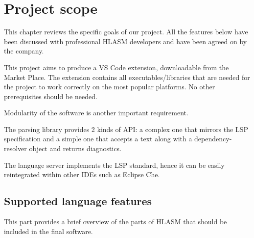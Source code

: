 \chapter{Project scope}

This chapter reviews the specific goals of our project.
All the features below have been discussed with professional HLASM developers and have been agreed on by the company.

This project aims to produce a VS Code extension, downloadable from the Market Place. The extension contains all executables/libraries that are needed for the project to work correctly on the most popular platforms. No other prerequisites should be needed.

Modularity of the software is another important requirement. 

The parsing library provides 2 kinds of API: a complex one that mirrors the LSP specification and a simple one that accepts a text along with a dependency-resolver object and returns diagnostics. 

The language server implements the LSP standard, hence it can be easily reintegrated within other IDEs such as Eclipse Che.

\section{Supported language features}
This part provides a brief overview of the parts of HLASM that should be included in the final software.

